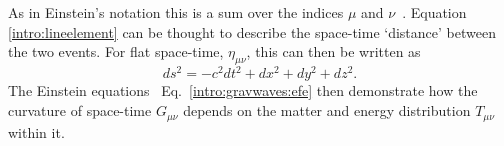As in Einstein's notation this is a sum over the indices $\mu$ and
$\nu$~.  Equation \ref{intro:lineelement} can be
thought to describe the space-time `distance' between the two events.  For flat
space-time, $\eta_{\mu\nu}$, this can then be written as
%
\begin{equation}
    ds^2 = -c^2 dt^2 + dx^2 + dy^2 + dz^2.
\end{equation}
%
The Einstein equations~ Eq.~\ref{intro:gravwaves:efe}
then demonstrate how the curvature of space-time $G_{\mu\nu}$ depends on the
matter and energy distribution $T_{\mu \nu}$ within it.~

